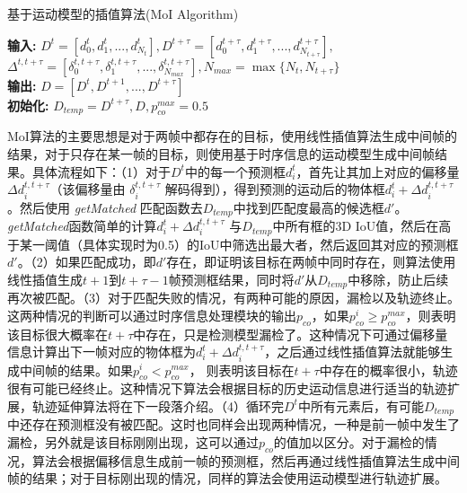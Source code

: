 \begin{algorithm}[!h]
	\caption{基于运动模型的插值算法(MoI Algorithm)}
	\label{alg:interpolation}
	\textbf{输入: } $D^t= [d^t_0, d^t_1, ..., d^t_{N_t}], D^{t+\tau}= [d^{t+\tau}_0, d^{t+\tau}_1, ..., d^{t+\tau}_{N_{t+\tau}}],$
	$\Delta^{t, t+\tau}=[\delta^{t, t+\tau}_0, \delta^{t, t+\tau}_1, ..., \delta^{t, t+\tau}_{N_{max}}], N_{max} = \max\{N_t, N_{t+\tau}\}$\\
	\textbf{输出: } $D = [D^t, D^{t+1}, ..., D^{t+\tau}]$\\
	\textbf{初始化:} $D_{temp} = D^{t+\tau}, D, p_{co}^{max} = 0.5$ \\
\end{algorithm}

MoI算法的主要思想是对于两帧中都存在的目标，使用线性插值算法生成中间帧的结果，对于只存在某一帧的目标，则使用基于时序信息的运动模型生成中间帧结果。具体流程如下：（1）对于$D^t$中的每一个预测框$d^t_i$，首先让其加上对应的偏移量$\Delta d_i^{t,t+\tau}$（该偏移量由 $\delta_i^{t,t+\tau}$ 解码得到），得到预测的运动后的物体框$d^t_i + \Delta d_i^{t,t+\tau}$。然后使用 \textit{getMatched} 匹配函数去$D_{temp}$中找到匹配度最高的候选框$d'$。\textit{getMatched}函数简单的计算$d^t_i + \Delta d_i^{t,t+\tau}$ 与$D_{temp}$中所有框的3D IoU值，然后在高于某一阈值（具体实现时为0.5）的IoU中筛选出最大者，然后返回其对应的预测框$d'$。（2）如果匹配成功，即$d'$存在，即证明该目标在两帧中同时存在，则算法使用线性插值生成$t+1$到$t+\tau-1$帧预测框结果，同时将$d'$从$D_{temp}$中移除，防止后续再次被匹配。（3）对于匹配失败的情况，有两种可能的原因，漏检以及轨迹终止。这两种情况的判断可以通过时序信息处理模块的输出$p_{co}$，如果$p_{co}^i \geq p_{co}^{max}$，则表明该目标很大概率在$t+\tau$中存在，只是检测模型漏检了。这种情况下可通过偏移量信息计算出下一帧对应的物体框为$d^t_i + \Delta d^{t, t+ \tau}_{i}$，之后通过线性插值算法就能够生成中间帧的结果。如果$p_{co}^i < p_{co}^{max}$， 则表明该目标在$t+\tau$中存在的概率很小，轨迹很有可能已经终止。这种情况下算法会根据目标的历史运动信息进行适当的轨迹扩展，轨迹延伸算法将在下一段落介绍。（4）循环完$D^t$中所有元素后，有可能$D_{temp}$中还存在预测框没有被匹配。这时也同样会出现两种情况，一种是前一帧中发生了漏检，另外就是该目标刚刚出现，这可以通过$p_{co}$的值加以区分。对于漏检的情况，算法会根据偏移信息生成前一帧的预测框，然后再通过线性插值算法生成中间帧的结果；对于目标刚出现的情况，同样的算法会使用运动模型进行轨迹扩展。

